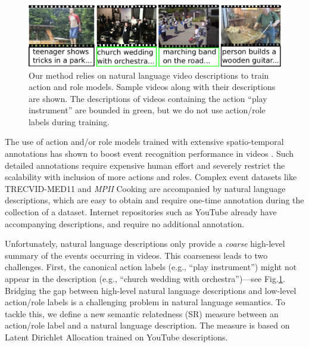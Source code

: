 \documentclass[10pt,twocolumn,letterpaper]{article}
\begin{document}
\begin{figure}[ht!]
\centering
   \includegraphics[scale = 0.4]{../images/pullFigure_2.pdf}
      \caption{Our method relies on natural language video descriptions to
      train action and role models. Sample videos along with their
      descriptions are shown.
      The descriptions of videos containing the action
      ``play instrument'' are bounded in green,
      but we do not use action/role labels during training.}
\label{fig:pull_figure}
\end{figure}

The use of action and/or role models trained with extensive spatio-temporal
annotations has shown to boost event recognition performance in videos
\cite{Izadinia_ECCV12, Lan_CVPR12}. Such detailed annotations require expensive
human effort and severely restrict the scalability with inclusion of more
actions and roles.
Complex event datasets like TRECVID-MED11 \cite{MED11} and \textit{MPII} Cooking
\cite{Regneri_TACL13} are accompanied by natural language descriptions,
which are easy to obtain and require one-time annotation during the
collection of a dataset.
Internet repositories such as YouTube already have accompanying descriptions,
and require no additional annotation.

Unfortunately,
natural language descriptions only provide a \emph{coarse} high-level summary of the events
occurring in videos.
This coarseness leads to two challenges.
First, the canonical action labels (e.g., ``play instrument'')
might not appear in the description (e.g., ``church wedding with orchestra'')---see
Fig.\ref{fig:pull_figure}.
Bridging the gap between high-level natural language descriptions and low-level action/role labels
is a challenging problem in natural language semantics.
To tackle this, we define a new semantic
relatedness (SR) measure between an action/role label and a natural language description.
The measure is based on Latent Dirichlet Allocation \cite{???} trained on
YouTube descriptions.
\end{document}
